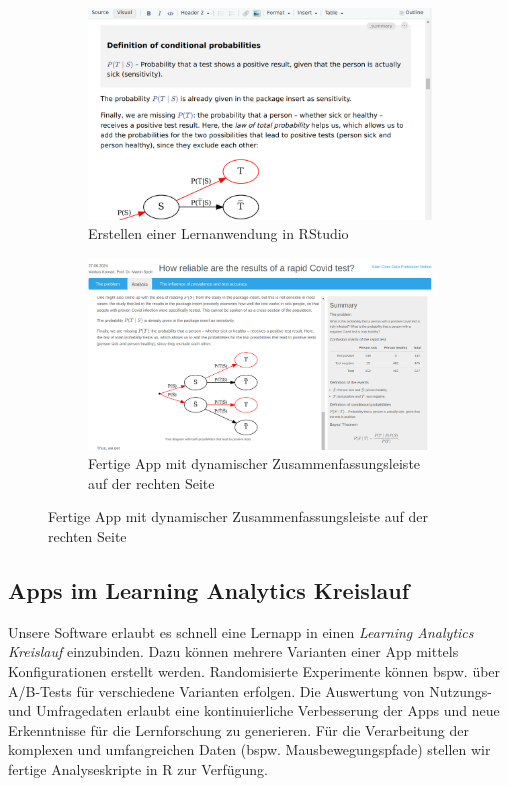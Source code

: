 \documentclass[a0,portrait]{a0poster}
\begin{document}
\begin{multicols}{2}
\vspace{1cm}

\begin{figure}[H]
\hfill
\begin{subfigure}[h]{0.45\linewidth}
\includegraphics[width=\linewidth]{at-visual-smaller}
\caption*{\footnotesize Erstellen einer Lernanwendung in RStudio}
\end{subfigure}
\hfill
\begin{subfigure}[h]{0.45\linewidth}
\includegraphics[width=\linewidth]{app-summary}
\caption*{\footnotesize Fertige App mit dynamischer Zusammenfassungsleiste auf der rechten Seite}
\end{subfigure}
\hfill
\end{figure}

\subsection*{Apps im Learning Analytics Kreislauf}

Unsere Software erlaubt es schnell eine Lernapp in einen \textit{Learning Analytics Kreislauf} einzubinden. Dazu können mehrere Varianten einer App mittels Konfigurationen erstellt werden. Randomisierte Experimente können bspw. über A/B-Tests für verschiedene Varianten erfolgen. Die Auswertung von Nutzungs- und Umfragedaten erlaubt eine kontinuierliche Verbesserung der Apps und neue Erkenntnisse für die Lernforschung zu generieren. Für die Verarbeitung der komplexen und umfangreichen Daten (bspw. Mausbewegungspfade) stellen wir fertige Analyseskripte in R zur Verfügung.


\end{multicols}
\end{document}
